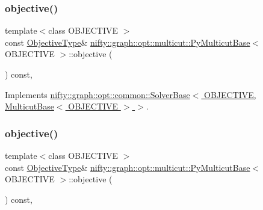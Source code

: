 \subsubsection{\texorpdfstring{objective()}{objective()}\hspace{0.1cm}{\footnotesize\ttfamily [1/2]}}
{\footnotesize\ttfamily template$<$class O\+B\+J\+E\+C\+T\+I\+VE $>$ \\
const \hyperlink{classnifty_1_1graph_1_1opt_1_1multicut_1_1PyMulticutBase_a434bee3be13abad62cacc5fbc4549cde}{Objective\+Type}\& \hyperlink{classnifty_1_1graph_1_1opt_1_1multicut_1_1PyMulticutBase}{nifty\+::graph\+::opt\+::multicut\+::\+Py\+Multicut\+Base}$<$ O\+B\+J\+E\+C\+T\+I\+VE $>$\+::objective (\begin{DoxyParamCaption}{ }\end{DoxyParamCaption}) const\hspace{0.3cm}{\ttfamily [inline]}, {\ttfamily [virtual]}}



Implements \hyperlink{classnifty_1_1graph_1_1opt_1_1common_1_1SolverBase_a55e9eb645c07d6e0782ebfb990ab3c84}{nifty\+::graph\+::opt\+::common\+::\+Solver\+Base$<$ O\+B\+J\+E\+C\+T\+I\+V\+E, Multicut\+Base$<$ O\+B\+J\+E\+C\+T\+I\+V\+E $>$ $>$}.

\mbox{\label{classnifty_1_1graph_1_1opt_1_1multicut_1_1PyMulticutBase_a0cad5268fb85b36ab8a73d6f08eeef38}} 
\subsubsection{\texorpdfstring{objective()}{objective()}\hspace{0.1cm}{\footnotesize\ttfamily [2/2]}}
{\footnotesize\ttfamily template$<$class O\+B\+J\+E\+C\+T\+I\+VE $>$ \\
const \hyperlink{classnifty_1_1graph_1_1opt_1_1multicut_1_1PyMulticutBase_a434bee3be13abad62cacc5fbc4549cde}{Objective\+Type}\& \hyperlink{classnifty_1_1graph_1_1opt_1_1multicut_1_1PyMulticutBase}{nifty\+::graph\+::opt\+::multicut\+::\+Py\+Multicut\+Base}$<$ O\+B\+J\+E\+C\+T\+I\+VE $>$\+::objective (\begin{DoxyParamCaption}{ }\end{DoxyParamCaption}) const\hspace{0.3cm}{\ttfamily [inline]}, {\ttfamily [virtual]}}



